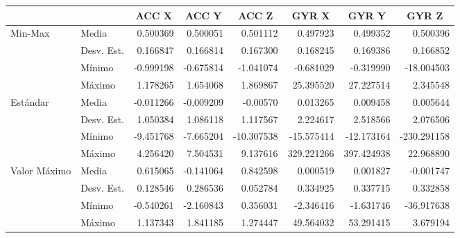 \begin{landscape}
\pagestyle{empty}
\begin{table}[p!]

\centering
\begin{tabular}{ll|r|r|r|r|r|r|}
\cline{3-8}
 &  & \multicolumn{1}{c|}{\textbf{ACC X}} & \multicolumn{1}{c|}{\textbf{ACC Y}} & \multicolumn{1}{c|}{\textbf{ACC Z}} & \multicolumn{1}{c|}{\textbf{GYR X}} & \multicolumn{1}{c|}{\textbf{GYR Y}} & \multicolumn{1}{c|}{\textbf{GYR Z}} \\ \hline
\multicolumn{1}{|l|}{\multirow{4}{*}{Min-Max}} & Media & 0.500369	 & 0.500051 & 0.501112 & 0.497923 & 0.499352 & 0.500396 \\ \cline{2-8} 
\multicolumn{1}{|l|}{}                  & Desv. Est. & 0.166847 & 0.166814 & 0.167300 & 0.168245 & 0.169386 & 0.166852 \\ \cline{2-8} 
\multicolumn{1}{|l|}{}                  & M\'{i}nimo & -0.999198 & -0.675814	& -1.041074 & -0.681029 & -0.319990 & -18.004503 \\ \cline{2-8} 
\multicolumn{1}{|l|}{}                  & M\'{a}ximo & 1.178265 & 1.654068 & 1.869867 & 25.395520 & 27.227514 & 2.345548 \\ \hline
\multicolumn{1}{|l|}{\multirow{4}{*}{Est\'{a}ndar}} & Media & -0.011266 & -0.009209 & -0.00570 & 0.013265 & 0.009458 & 0.005644 \\ \cline{2-8} 
\multicolumn{1}{|l|}{}                  & Desv. Est. & 1.050384 & 1.086118 & 1.117567 & 2.224617 & 2.518566 & 2.076506 \\ \cline{2-8} 
\multicolumn{1}{|l|}{}                  & M\'{i}nimo & -9.451768 & -7.665204 & -10.307538 & -15.575414	 & -12.173164 & -230.291158 \\ \cline{2-8} 
\multicolumn{1}{|l|}{}                  & M\'{a}ximo & 4.256420 & 7.504531 & 9.137616 & 329.221266 & 397.424938 & 22.968890 \\ \hline
\multicolumn{1}{|l|}{\multirow{4}{*}{Valor M\'{a}ximo}} & Media & 0.615065 & -0.141064 & 0.842598 & 0.000519 & 0.001827 & -0.001747 \\ \cline{2-8} 
\multicolumn{1}{|l|}{}                  & Desv. Est. & 0.128546 & 0.286536 & 0.052784 & 0.334925 & 0.337715 & 0.332858 \\ \cline{2-8} 
\multicolumn{1}{|l|}{}                  & M\'{i}nimo & -0.540261 & -2.160843	& 0.356031 & -2.346416 & -1.631746 & -36.917638 \\ \cline{2-8} 
\multicolumn{1}{|l|}{}                  & M\'{a}ximo & 1.137343 & 1.841185 & 1.274447 & 49.564032 & 53.291415 & 3.679194 \\ \hline

\end{tabular}
\end{table}
\end{landscape}
